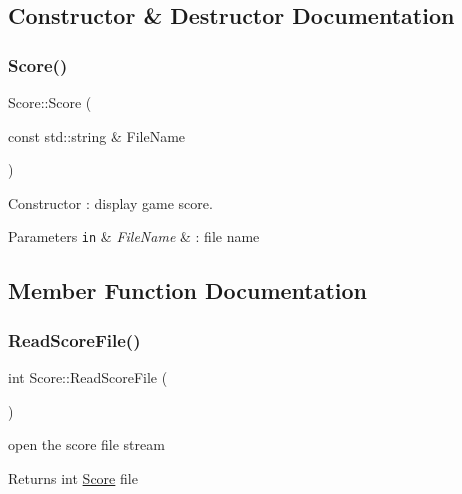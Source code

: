 \subsection{Constructor \& Destructor Documentation}
\mbox{\label{class_score_a3b3407ca64d44deddef0c688db7c08da}} 
\subsubsection{\texorpdfstring{Score()}{Score()}}
{\footnotesize\ttfamily Score\+::\+Score (\begin{DoxyParamCaption}\item[{const std\+::string \&}]{File\+Name }\end{DoxyParamCaption})}



Constructor \+: display game score. 


\begin{DoxyParams}[1]{Parameters}
\mbox{\tt in}  & {\em File\+Name} & \+: file name \\
\hline
\end{DoxyParams}


\subsection{Member Function Documentation}
\mbox{\label{class_score_ad8c669f62f20e3db4e814366ce41682a}} 
\subsubsection{\texorpdfstring{Read\+Score\+File()}{ReadScoreFile()}}
{\footnotesize\ttfamily int Score\+::\+Read\+Score\+File (\begin{DoxyParamCaption}{ }\end{DoxyParamCaption})}



open the score file stream 

\begin{DoxyReturn}{Returns}
int \hyperlink{class_score}{Score} file 
\end{DoxyReturn}
\mbox{\label{class_score_a9999a47bbd571bc5393b77325ad97e91}} 
